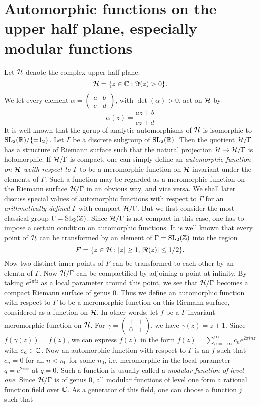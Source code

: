 \section{Automorphic functions on the upper half plane, especially modular functions}



Let $\mathcal{H}$ denote the complex upper half plane:
\[
    \mathcal{H} = \{z \in \mathbb{C}: \Im(z) > 0\}.
\]
We let every element $\alpha = \left(\begin{smallmatrix}a&b\\c&d\end{smallmatrix}\right)$, with $\det(\alpha) > 0$, act on $\mathcal{H}$ by
\begin{equation}
    \alpha(z) = \frac{az + b}{cz + d}
\end{equation}
It is well known that the gorup of analytic automorphisms of $\mathcal{H}$ is isomorphic to $\mathrm{SL}_2(\mathbb{R}) / \{\pm 1_2\}$. Let $\Gamma$ be a discrete subgroup of $\mathrm{SL}_2(\mathbb{R})$. Then the quotient $\mathcal{H} / \Gamma$ has a structure of Riemann surface such that the natural projection $\mathcal{H} \to \mathcal{H}/ \Gamma$ is holomorphic. If $\mathcal{H}/\Gamma$ is compact, one can simply define an \emph{automorphic function on $\mathcal{H}$ weith respect to $\Gamma$} to be a meromorphic function on $\mathcal{H}$ invariant under the elements of $\Gamma$.
Such a function may be regarded as a meromorphic function on the Riemann surface $\mathcal{H} / \Gamma$ in an obvious way, and vice versa.
We shall later discuss special values of automorphic functions with respect to $\Gamma$ for an \emph{arithmetically defined} $\Gamma$ with compact $\mathcal{H} / \Gamma$. But we first consider the most classical group $\Gamma = \mathrm{SL}_2(\mathbb{Z})$. Since $\mathcal{H}/ \Gamma$ is not compact in this case, one has to impose a certain condition on automorphic functions. It is well known that every point of $\mathcal{H}$ can be transformed by an element of $\Gamma = \mathrm{SL}_2(\mathbb{Z})$ into the region
\[
    F = \{z \in \mathcal{H}: |z| \geq 1, |\Re(z)| \leq 1/2\}.
\]
Now two distinct inner points of $F$ can be transformed to each other by an elemtn of $\Gamma$. Now $\mathcal{H} / \Gamma$ can be compactified by adjoining a point at infinity. By taking $e^{2 \pi i z}$ as a local parameter around this point, we see that $\mathcal{H}/ \Gamma$ becomes a compact Riemann surface of genus $0$.
Thus we define an automorphic function with respect to $\Gamma$ to be a meromorphic function on this Riemann surface, considered as a function on $\mathcal{H}$. 
In other words, let $f$ be a $\Gamma$-invariant meromorphic function on $\mathcal{H}$. For $\gamma = \left(\begin{smallmatrix}
    1 & 1 \\ 0 & 1
\end{smallmatrix}\right)$, we have $\gamma(z) = z + 1$. Since $f(\gamma(z)) = f(z)$, we can express $f(z)$ in the form $f(z) = \sum_{n =-\infty}^{\infty} c_n e^{2 \pi i n z}$ with $c_n \in \mathbb{C}$. Now an automorphic function with respect to $\Gamma$ is an $f$ such that $c_n = 0$ for all $n < n_0$ for some $n_0$, i.e. meromorphic in the local parameter $q = e^{2 \pi i z}$ at $q = 0$. Such a function is usually called a \emph{modular function of level one}. Since $\mathcal{H} / \Gamma$ is of genus $0$, all modular functions of level one form a rational function field over $\mathbb{C}$. As a generator of this field, one can choose a function $j$ such that
